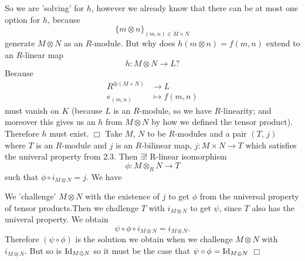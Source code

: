 \documentclass{article}
\begin{document}
So we are 'solving' for $h$, however we already know that there can be at most one option for $h$, because \[\{m \otimes n\}_{(m,n) \in M \times N} \]
generate $M\otimes N$ as an $R$-module. \gap
But why does $h(m\otimes n)=f(m,n)$ extend to an $R$-linear map \[ h : M \otimes N \to L ? \]
Because \begin{align*}R^{\oplus(M\times N)} &\to L \\ e_{(m,n)} &\mapsto f(m,n)\end{align*}
must vanish on $K$ (because $L$ is an $R$-module, so we have $R$-linearity; and moreover this gives us an $h$ from $M \otimes N$ by how we defined the tensor product). Therefore $h$ must exist. \newline \flushright $\Box$ \flushleft
\prop Take $M$, $N$ to be $R$-modules and a pair $(T,\, j)$ where $T$ is an $R$-module and $j$ is an $R$-bilinear map, $j : M\times N \to T$ which satisfies the univeral property from 2.3. Then $\exists!$ R-linear isomorphism \[ \phi : M \otimes_{R} N \to T\]
such that $\phi \circ i_{M\otimes N} = j$.
\gap
\newpage
\proof We have \gap
\begin{center}

\end{center}
We 'challenge' $M\otimes N$ with the existence of $j$ to get $\phi$ from the universal property of tensor products.\gap Then we challenge $T$ with $i_{M\otimes N}$ to get $\psi$, since $T$ also has the univeral property. We obtain \[ \psi \circ \phi \circ i_{M \otimes N} = i_{M\otimes N}.\] Therefore $(\psi \circ \phi)$ is the solution we obtain when we challenge $M \otimes N$ with $i_{M \otimes N}$. But so is $\operatorname{Id}_{M\otimes N}$ so it must be the case that $ \psi \circ \phi = \operatorname{Id}_{M \otimes N}$
\flushright $\Box$ \flushleft


\newlec
\end{document}
